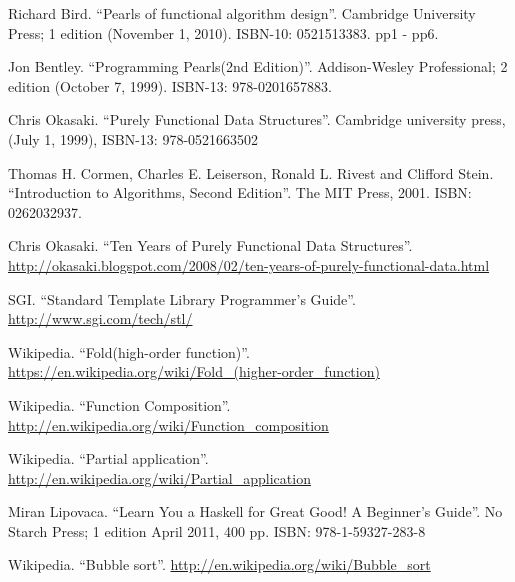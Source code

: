 
\begin{thebibliography}{99}


Richard Bird. ``Pearls of functional algorithm design''. Cambridge University Press; 1 edition (November 1, 2010). ISBN-10: 0521513383. pp1 - pp6.

Jon Bentley. ``Programming Pearls(2nd Edition)''. Addison-Wesley Professional; 2 edition (October 7, 1999). ISBN-13: 978-0201657883.

Chris Okasaki. ``Purely Functional Data Structures''. Cambridge university press, (July 1, 1999), ISBN-13: 978-0521663502

Thomas H. Cormen, Charles E. Leiserson, Ronald L. Rivest and Clifford Stein. ``Introduction to Algorithms, Second Edition''. The MIT Press, 2001. ISBN: 0262032937.


Chris Okasaki. ``Ten Years of Purely Functional Data Structures''. \url{http://okasaki.blogspot.com/2008/02/ten-years-of-purely-functional-data.html}

SGI. ``Standard Template Library Programmer's Guide''. \url{http://www.sgi.com/tech/stl/}


Wikipedia. ``Fold(high-order function)''. \url{https://en.wikipedia.org/wiki/Fold_(higher-order_function)}

Wikipedia. ``Function Composition''. \url{http://en.wikipedia.org/wiki/Function_composition}

Wikipedia. ``Partial application''. \url{http://en.wikipedia.org/wiki/Partial_application}

Miran Lipovaca. ``Learn You a Haskell for Great Good! A Beginner's Guide''. No Starch Press; 1 edition April 2011, 400 pp. ISBN: 978-1-59327-283-8

Wikipedia. ``Bubble sort''. \url{http://en.wikipedia.org/wiki/Bubble_sort}


\end{thebibliography}
